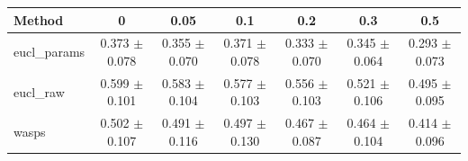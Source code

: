 \begin{table}[htbp]
\centering
\begin{NiceTabular}{lcccccc}
\toprule
Method & 0 & 0.05 & 0.1 & 0.2 & 0.3 & 0.5 \\
\midrule
eucl\_params & 0.373 $\pm$ 0.078 & 0.355 $\pm$ 0.070 & 0.371 $\pm$ 0.078 & 0.333 $\pm$ 0.070 & 0.345 $\pm$ 0.064 & 0.293 $\pm$ 0.073 \\
eucl\_raw & 0.599 $\pm$ 0.101 & 0.583 $\pm$ 0.104 & 0.577 $\pm$ 0.103 & 0.556 $\pm$ 0.103 & 0.521 $\pm$ 0.106 & 0.495 $\pm$ 0.095 \\
wasps & 0.502 $\pm$ 0.107 & 0.491 $\pm$ 0.116 & 0.497 $\pm$ 0.130 & 0.467 $\pm$ 0.087 & 0.464 $\pm$ 0.104 & 0.414 $\pm$ 0.096 \\
\bottomrule
\end{NiceTabular}
\label{tab:sens_cpazmal_decimation_barycenter}
\end{table}
